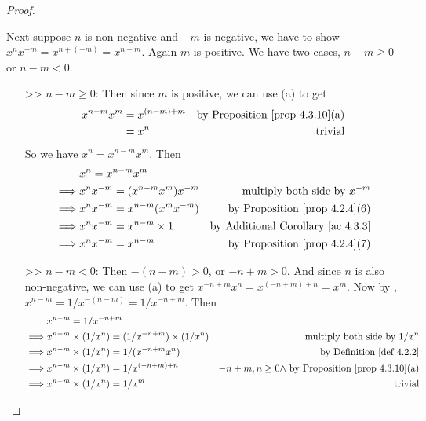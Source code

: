 \begin{proof}
\begin{itemize}
        Next suppose \(n\) is non-negative and \(-m\) is negative, we have to show \(x^n x^{-m} = x^{n + (-m)} = x^{n - m}\).
        Again \(m\) is positive.
        We have two cases, \(n - m \ge 0\) or \(n - m < 0\).
        \begin{itemize}
            \item[>>] \(n - m \ge 0\):
                Then since \(m\) is positive, we can use (a) to get
                \begin{align*}
                    x^{n - m}x^m & = x^{(n - m) + m} & \text{by \PROP{4.3.10}(a)} \\
                                 & = x^n & \text{trivial}
                \end{align*}
                So we have \(x^n = x^{n - m}x^m\).
                Then
                \begin{align*}
                             & x^n = x^{n - m}x^m \\
                    \implies & x^n x^{-m} = (x^{n - m}x^m) x^{-m} & \text{multiply both side by \(x^{-m}\)} \\
                    \implies & x^n x^{-m} = x^{n - m} (x^m x^{-m}) & \text{by \PROP{4.2.4}(6)} \\
                    \implies & x^n x^{-m} = x^{n - m} \X 1 & \text{by \AC{4.3.3}} \\
                    \implies & x^n x^{-m} = x^{n - m} & \text{by \PROP{4.2.4}(7)}
                \end{align*}
            \item[>>] \(n - m < 0\):
                Then \(-(n -m) > 0\), or \(-n + m > 0\).
                And since \(n\) is also non-negative, we can use (a) to get \(x^{-n + m }x^n = x^{(-n + m) + n} = x^m\).
                Now by , \(x^{n-m} = 1 / x^{-(n-m)} = 1 / x^{-n+m}\).
                Then
                \begin{align*}
                             & x^{n-m} = 1 / x^{-n+m} \\
                    \implies & x^{n-m} \X (1 / x^n) = (1 / x^{-n+m}) \X (1 / x^n) & \text{multiply both side by \(1 / x^n\)} \\
                    \implies & x^{n-m} \X (1 / x^n) = 1 / (x^{-n+m} x^n) & \text{by \DEF{4.2.2}} \\
                    \implies & x^{n-m} \X (1 / x^n) = 1 / x^{(-n+m) + n} & \text{\(-n+m, n \ge 0 \land\) by \PROP{4.3.10}(a)} \\
                    \implies & x^{n-m} \X (1 / x^n) = 1 / x^m & \text{trivial} \\

\end{align*}
\end{itemize}
\end{itemize}
\end{proof}
